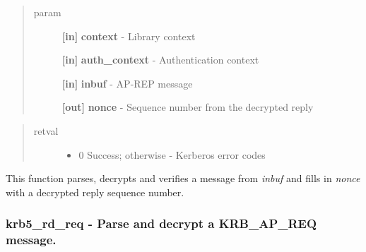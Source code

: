 \documentclass[letterpaper,10pt,english]{sphinxmanual}
\begin{document}
\begin{quote}\begin{description}
\item[{param}] \leavevmode
\textbf{{[}in{]}} \textbf{context} - Library context

\textbf{{[}in{]}} \textbf{auth\_context} - Authentication context

\textbf{{[}in{]}} \textbf{inbuf} - AP-REP message

\textbf{{[}out{]}} \textbf{nonce} - Sequence number from the decrypted reply

\end{description}\end{quote}
\begin{quote}\begin{description}
\item[{retval}] \leavevmode\begin{itemize}
\item {} 
0   Success; otherwise - Kerberos error codes

\end{itemize}

\end{description}\end{quote}

This function parses, decrypts and verifies a message from \emph{inbuf} and fills in \emph{nonce} with a decrypted reply sequence number.


\subsubsection{krb5\_rd\_req -  Parse and decrypt a KRB\_AP\_REQ message.}
\label{appdev/refs/api/krb5_rd_req::doc}\label{appdev/refs/api/krb5_rd_req:krb5-rd-req-parse-and-decrypt-a-krb-ap-req-message}

\begin{fulllineitems}
\label{appdev/refs/api/krb5_rd_req:c.krb5_rd_req}
\end{fulllineitems}
\end{document}
